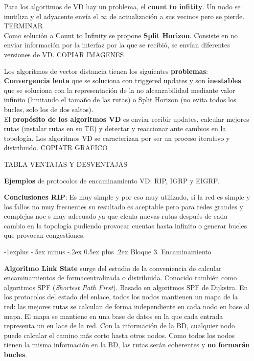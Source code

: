 \documentclass[10pt,portrait, twocolumn]{article}
\makeatletter
\renewcommand{\subsection}{\@startsection{subsection}{2}{0mm}%
                                {-1explus -.5ex minus -.2ex}%
                                {0.5ex plus .2ex}%
                                {\normalfont\normalsize\bfseries}}
\makeatother
\begin{document}
Para los algoritmos de VD hay un problema, el \textbf{count to infitity}. Un nodo se inutiliza y el adyacente envía el $\infty$ de actualización a sus vecinos pero se pierde. TERMINAR\\

Como solución a Count to Infinity se propone \textbf{Split Horizon}. Consiste en no enviar información por la interfaz por la que se recibió, se envían diferentes versiones de VD. COPIAR IMAGENES

Los algoritmos de vector distancia tienen los siguientes \textbf{problemas}: \textbf{Convergencia lenta} que se soluciona con triggered updates y son \textbf{inestables} que se soluciona con la representación de la no alcanzabilidad mediante valor infinito (limitando el tamaño de las rutas) o Split Horizon (no evita todos los bucles, solo los de dos saltos).\\

El \textbf{propósito de los algoritmos VD} es enviar recibir updates, calcular mejores rutas (instalar rutas en su TE) y detectar y reaccionar ante cambios en la topología. Los algoritmos VD se caracterizan por ser un proceso iterativo y distribuido. COPIATR GRAFICO

TABLA VENTAJAS Y DESVENTAJAS

\textbf{Ejemplos} de protocolos de encaminamiento VD: RIP, IGRP y EIGRP.

\textbf{Conclusiones RIP}: Es muy simple y por eso muy utilizado, si la red es simple y los fallos no muy frecuentes su resultado es aceptable pero para redes grandes y complejas noe s muy adecuado ya que clcula nuevas rutas después de cada cambio en la topología pudiendo provocar cuentas hasta infinito o generar bucles que provocan congestiones.


\subsection{Bloque 3. Encaminamiento}

\hrulefill

\textbf{Algoritmo Link State} surge del estudio de la conveniencia de calcular encaminamientos de formacentralizada o distribuida. Conocido también como algoritmos SPF (\textit{Shortest Path First}). Basado en algoritmos SPF de Dijkstra. En los protocolos del estado del enlace, todos los nodos mantienen un mapa de la red: las mejores rutas se calculan de forma independiente en cada nodo en base al mapa. El mapa se mantiene en una base de datos en la que cada entrada representa un en lace de la red. Con la información de la BD, cualquier nodo puede calcular el camino más corto hasta otros nodos. Como todos los nodos tienen la misma información en la BD, las rutas serán coherentes y \textbf{no formarán bucles}.
\end{document}

